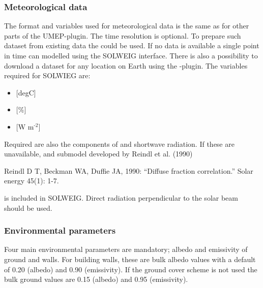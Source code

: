 \documentclass[letterpaper,10pt,english]{sphinxmanual}
\begin{document}
\subsubsection{Meteorological data}
\label{\detokenize{OtherManuals/SOLWEIG:meteorological-data}}
The format and variables used for meteorological data is the same as for
other parts of the UMEP-plugin. The time resolution is optional. To
prepare such dataset from existing data the {\hyperref[\detokenize{pre-processor/Meteorological Data MetPreprocessor:metpreprocessor}]{}}
could be used. If no data is available a single point in time can
modelled using the SOLWEIG interface. There is also a possibility to
download a dataset for any location on Earth using the {\hyperref[\detokenize{pre-processor/Meteorological Data Download data (WATCH):watch}]{}}-plugin.
The variables required for SOLWIEG are:
\begin{itemize}
\item {} 
 {[}degC{]}

\item {} 
 {[}\%{]}

\item {} 
 {[}W m$^{\text{-2}}${]}

\end{itemize}

Required are also the components of  and  shortwave
radiation. If these are unavailable, and submodel developed by Reindl et
al. (1990)  %
\begin{footnote}[4]\sphinxAtStartFootnote
Reindl D T, Beckman WA, Duffie JA, 1990: “Diffuse fraction
correlation.” Solar energy 45(1): 1-7.
%
\end{footnote} is included in SOLWEIG. Direct radiation perpendicular
to the solar beam should be used.


\subsubsection{Environmental parameters}
\label{\detokenize{OtherManuals/SOLWEIG:environmental-parameters}}
Four main environmental parameters are mandatory; albedo and emissivity
of ground and walls. For building walls, these are bulk albedo values
with a default of 0.20 (albedo) and 0.90 (emissivity). If the ground
cover scheme is not used the bulk ground values are 0.15 (albedo) and
0.95 (emissivity).
\end{document}
